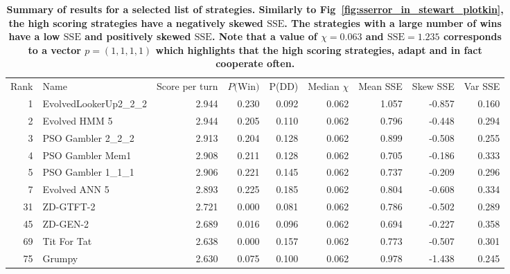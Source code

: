 \documentclass[10pt,letterpaper]{article}
\newlength\savedwidth
\newcommand\thickhline{\noalign{\global\savedwidth\arrayrulewidth\global\arrayrulewidth 2pt}%
\hline
\noalign{\global\arrayrulewidth\savedwidth}}
\newcommand{\SSe}{\text{SSE}}
\begin{document}
\begin{table}[!hbtp]
    \begin{adjustwidth}{-2.25in}{0in} %
    \centering
    \caption{
        {\bf Summary of results for a selected list of strategies. Similarly to
        Fig~\ref{fig:sserror_in_stewart_plotkin}, the high scoring strategies
        have a negatively skewed \(\SSe\). The strategies with a
        large number of wins have a low \(\SSe\) and positively skewed
        \(\SSe\). Note that a value of \(\chi=0.063\) and \(\SSe=1.235\)
        corresponds to a vector \(p=(1,1,1,1)\) which highlights that the high
        scoring strategies, adapt and in fact cooperate often.}}
    \label{tbl:overall_summary_results}
    \small
\begin{tabular}{rlrrrrrrr}
\hline
 Rank &                  Name &  Score per turn &  $P($Win$)$ &  P(DD) &  Median $\chi$ &  Mean SSE &  Skew SSE &  Var SSE \\
\thickhline
    1 &  EvolvedLookerUp2\_2\_2 &           2.944 &       0.230 &  0.092 &          0.062 &     1.057 &    -0.857 &    0.160 \\
    2 &         Evolved HMM 5 &           2.944 &       0.205 &  0.110 &          0.062 &     0.796 &    -0.448 &    0.294 \\
    3 &     PSO Gambler 2\_2\_2 &           2.913 &       0.204 &  0.128 &          0.062 &     0.899 &    -0.508 &    0.255 \\
    4 &      PSO Gambler Mem1 &           2.908 &       0.211 &  0.128 &          0.062 &     0.705 &    -0.186 &    0.333 \\
    5 &     PSO Gambler 1\_1\_1 &           2.906 &       0.221 &  0.145 &          0.062 &     0.737 &    -0.209 &    0.296 \\
    7 &         Evolved ANN 5 &           2.893 &       0.225 &  0.185 &          0.062 &     0.804 &    -0.608 &    0.334 \\
   31 &             ZD-GTFT-2 &           2.721 &       0.000 &  0.081 &          0.062 &     0.786 &    -0.502 &    0.289 \\
   45 &              ZD-GEN-2 &           2.689 &       0.016 &  0.096 &          0.062 &     0.694 &    -0.227 &    0.358 \\
   69 &           Tit For Tat &           2.638 &       0.000 &  0.157 &          0.062 &     0.773 &    -0.507 &    0.301 \\
   75 &                Grumpy &           2.630 &       0.075 &  0.100 &          0.062 &     0.978 &    -1.438 &    0.245 \\

\end{tabular}
\end{adjustwidth}
\end{table}
\end{document}
